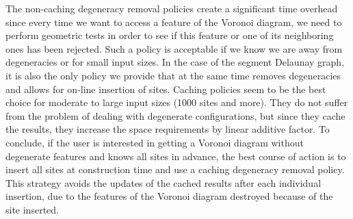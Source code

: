 The non-caching degeneracy removal policies create a significant time
overhead since every time we want to access a feature of the Voronoi
diagram, we need to perform geometric tests in order to see if this
feature or one of its neighboring ones has been rejected.
Such a policy is acceptable if we know we are away from
degeneracies or for small input sizes. In the case of the segment
Delaunay graph, it is also the only policy we provide that at the same
time removes degeneracies and allows for on-line insertion of sites.
Caching policies seem to be the best choice for moderate to large
input sizes (1000 sites and more). They do not suffer from the problem
of dealing with degenerate configurations, but since they cache the
results, they increase the space requirements by linear additive
factor.
%
To conclude, if the user is interested in getting a Voronoi diagram
without degenerate features and knows all sites in advance, the best course
of action is to insert all sites at construction time and use a caching
degeneracy removal policy. This strategy avoids the updates of the
cached results after each individual insertion, due to the features of
the Voronoi diagram destroyed because of the site inserted.

